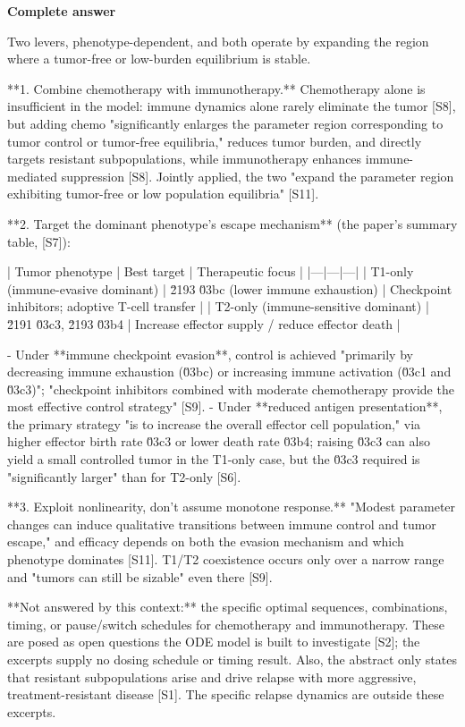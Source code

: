 \documentclass[10pt]{article}
\begin{document}
\textbf{Complete answer}
\begin{AnswerText}
Two levers, phenotype-dependent, and both operate by expanding the region where a tumor-free or low-burden equilibrium is stable.

**1. Combine chemotherapy with immunotherapy.** Chemotherapy alone is insufficient in the model: immune dynamics alone rarely eliminate the tumor [S8], but adding chemo "significantly enlarges the parameter region corresponding to tumor control or tumor-free equilibria," reduces tumor burden, and directly targets resistant subpopulations, while immunotherapy enhances immune-mediated suppression [S8]. Jointly applied, the two "expand the parameter region exhibiting tumor-free or low population equilibria" [S11].

**2. Target the dominant phenotype's escape mechanism** (the paper's summary table, [S7]):

| Tumor phenotype | Best target | Therapeutic focus |
|---|---|---|
| T1-only (immune-evasive dominant) | \u2193 \u03bc (lower immune exhaustion) | Checkpoint inhibitors; adoptive T-cell transfer |
| T2-only (immune-sensitive dominant) | \u2191 \u03c3, \u2193 \u03b4 | Increase effector supply / reduce effector death |

- Under **immune checkpoint evasion**, control is achieved "primarily by decreasing immune exhaustion (\u03bc) or increasing immune activation (\u03c1 and \u03c3)"; "checkpoint inhibitors combined with moderate chemotherapy provide the most effective control strategy" [S9].
- Under **reduced antigen presentation**, the primary strategy "is to increase the overall effector cell population," via higher effector birth rate \u03c3 or lower death rate \u03b4; raising \u03c3 can also yield a small controlled tumor in the T1-only case, but the \u03c3 required is "significantly larger" than for T2-only [S6].

**3. Exploit nonlinearity, don't assume monotone response.** "Modest parameter changes can induce qualitative transitions between immune control and tumor escape," and efficacy depends on both the evasion mechanism and which phenotype dominates [S11]. T1/T2 coexistence occurs only over a narrow range and "tumors can still be sizable" even there [S9].

**Not answered by this context:** the specific optimal sequences, combinations, timing, or pause/switch schedules for chemotherapy and immunotherapy. These are posed as open questions the ODE model is built to investigate [S2]; the excerpts supply no dosing schedule or timing result. Also, the abstract only states that resistant subpopulations arise and drive relapse with more aggressive, treatment-resistant disease [S1]. The specific relapse dynamics are outside these excerpts.
\end{AnswerText}
\end{document}
